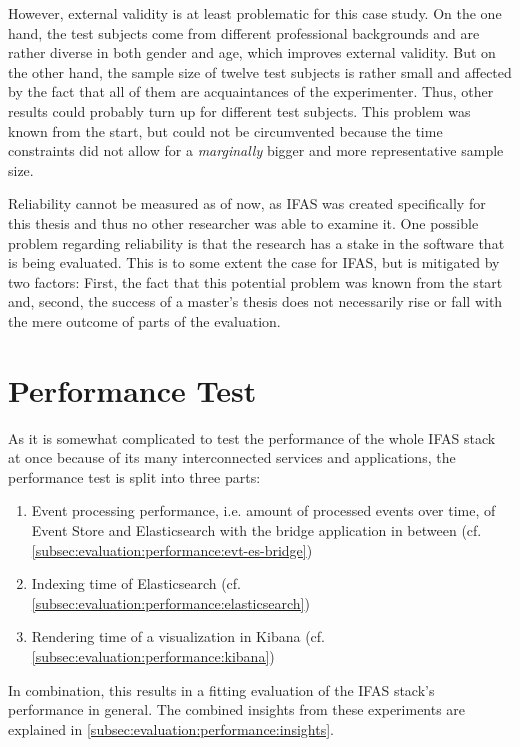 However, external validity is at least problematic for this case study.
On the one hand, the test subjects come from different professional backgrounds and are rather diverse in both gender and age, which improves external validity.
But on the other hand, the sample size of twelve test subjects is rather small and affected by the fact that all of them are acquaintances of the experimenter.
Thus, other results could probably turn up for different test subjects.
This problem was known from the start, but could not be circumvented because the time constraints did not allow for a \emph{marginally} bigger and more representative sample size.

Reliability cannot be measured as of now, as \ac{IFAS} was created specifically for this thesis and thus no other researcher was able to examine it.
One possible problem regarding reliability is that the research has a stake in the software that is being evaluated.
This is to some extent the case for \ac{IFAS}, but is mitigated by two factors:
First, the fact that this potential problem was known from the start and, second, the success of a master's thesis does not necessarily rise or fall with the mere outcome of parts of the evaluation.

\section{Performance Test}
\label{sec:evaluation:performance}

As it is somewhat complicated to test the performance of the whole \ac{IFAS} stack at once because of its many interconnected services and applications, the performance test is split into three parts:

\begin{enumerate}[noitemsep]
\item Event processing performance, i.e. amount of processed events over time, of Event Store and Elasticsearch with the bridge application in between (cf. \cref{subsec:evaluation:performance:evt-es-bridge})
\item Indexing time of Elasticsearch (cf. \cref{subsec:evaluation:performance:elasticsearch})
\item Rendering time of a visualization in Kibana (cf. \cref{subsec:evaluation:performance:kibana})
\end{enumerate}

In combination, this results in a fitting evaluation of the \ac{IFAS} stack's performance in general.
The combined insights from these experiments are explained in \cref{subsec:evaluation:performance:insights}.

